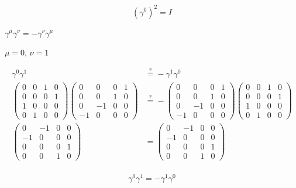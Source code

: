 \documentclass[11pt]{article}
\theoremstyle{definition}
\begin{document}
\begin{equation}
\boxed{
    (\gamma^0)^2 = I
}
\end{equation}


\underline{\underline{$\gamma^{\mu}\gamma^{\nu} = -\gamma^{\nu}\gamma^{\mu}$}}

$\mu = 0$, $\nu = 1$

\begin{align}
    \gamma^{0}\gamma^{1} &\stackrel{?}{=} -\gamma^{1}\gamma^{0}\\
    \begin{pmatrix}
        0&0&1&0\\ 
        0&0&0&1\\ 
        1&0&0&0\\ 
        0&1&0&0
    \end{pmatrix}
        \begin{pmatrix}0&0&0&1\\    0&0&1&0\\    0&-1&0&0\\    -1&0&0&0\end{pmatrix} &\stackrel{?}{=}-\begin{pmatrix}0&0&0&1\\      0&0&1&0\\     0&-1&0&0\\      -1&0&0&0\end{pmatrix}\begin{pmatrix}0&0&1&0\\      0&0&0&1\\      1&0&0&0\\      0&1&0&0\end{pmatrix}\\
    \begin{pmatrix}0&-1&0&0\\ -1&0&0&0\\ 0&0&0&1\\ 0&0&1&0\end{pmatrix} &= \begin{pmatrix}0&-1&0&0\\ -1&0&0&0\\ 0&0&0&1\\ 0&0&1&0\end{pmatrix}\\
\end{align}

\begin{equation}
\boxed{
    \gamma^{0}\gamma^{1} = -\gamma^{1}\gamma^{0}
}
\end{equation}
\end{document}
